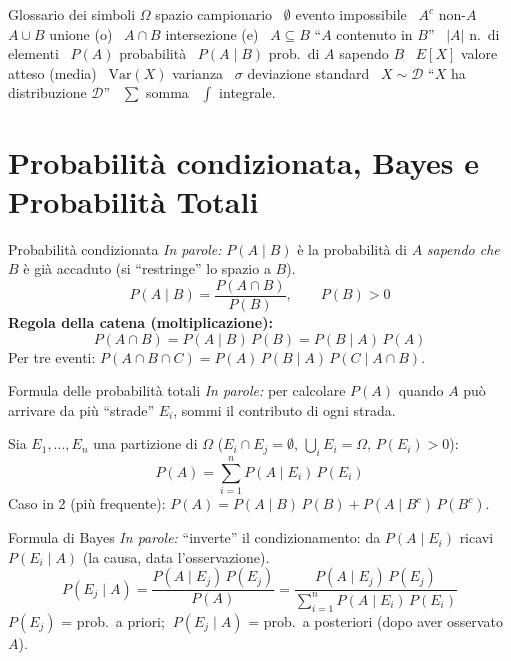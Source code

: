 \documentclass[11pt]{article}
\newcommand{\inparole}[1]{\emph{In parole:} #1}
\begin{document}
\begin{concetto}[barSlate]{Glossario dei simboli}
$\Omega$ spazio campionario \textbullet\ $\emptyset$ evento impossibile \textbullet\ $A^c$ non-$A$ \textbullet\ $A\cup B$ unione (o) \textbullet\ $A\cap B$ intersezione (e) \textbullet\ $A \subseteq B$ ``$A$ contenuto in $B$'' \textbullet\ $|A|$ n.\ di elementi \textbullet\ $P(A)$ probabilit\`a \textbullet\ $P(A\mid B)$ prob.\ di $A$ sapendo $B$ \textbullet\ $E[X]$ valore atteso (media) \textbullet\ $\mathrm{Var}(X)$ varianza \textbullet\ $\sigma$ deviazione standard \textbullet\ $X \sim \mathcal{D}$ ``$X$ ha distribuzione $\mathcal{D}$'' \textbullet\ $\sum$ somma \textbullet\ $\int$ integrale.
\end{concetto}

\newpage
\section{Probabilit\`a condizionata, Bayes e Probabilit\`a Totali}

\begin{concetto}{Probabilit\`a condizionata}
\inparole{$P(A\mid B)$ \`e la probabilit\`a di $A$ \emph{sapendo che} $B$ \`e gi\`a accaduto (si ``restringe'' lo spazio a $B$).}
\[ P(A \mid B) = \frac{P(A \cap B)}{P(B)}, \qquad P(B) > 0 \]
\textbf{Regola della catena (moltiplicazione):}
\[ P(A \cap B) = P(A \mid B)\, P(B) = P(B \mid A)\, P(A) \]
Per tre eventi: $P(A \cap B \cap C) = P(A)\, P(B \mid A)\, P(C \mid A \cap B)$.
\end{concetto}

\begin{concetto}{Formula delle probabilit\`a totali}
\inparole{per calcolare $P(A)$ quando $A$ pu\`o arrivare da pi\`u ``strade'' $E_i$, sommi il contributo di ogni strada.}

Sia $E_1, \dots, E_n$ una partizione di $\Omega$ ($E_i \cap E_j = \emptyset$, $\bigcup_i E_i = \Omega$, $P(E_i)>0$):
\[ P(A) = \sum_{i=1}^{n} P(A \mid E_i)\, P(E_i) \]
Caso in 2 (pi\`u frequente): $P(A) = P(A \mid B)\, P(B) + P(A \mid B^c)\, P(B^c)$.
\end{concetto}

\begin{concetto}{Formula di Bayes}
\inparole{``inverte'' il condizionamento: da $P(A\mid E_i)$ ricavi $P(E_i \mid A)$ (la causa, data l'osservazione).}
\[ P(E_j \mid A) = \frac{P(A \mid E_j)\, P(E_j)}{P(A)} = \frac{P(A \mid E_j)\, P(E_j)}{\displaystyle\sum_{i=1}^{n} P(A \mid E_i)\, P(E_i)} \]
$P(E_j)$ = prob.\ a priori; $\ P(E_j \mid A)$ = prob.\ a posteriori (dopo aver osservato $A$).
\end{concetto}
\end{document}
